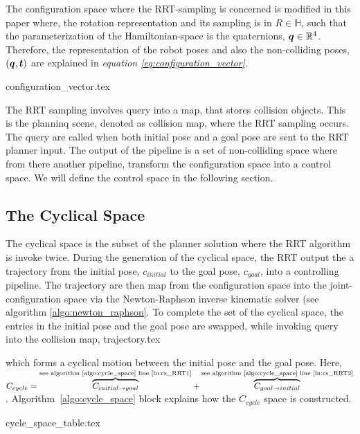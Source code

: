 \documentclass[a4paper, 10pt]{article}
\newcommand\thisPaperDir{/home/asl/version-control/ws_thesis/writing_papers/resampling_planning_in_dynamic_environment}
\numberwithin{equation}{section} %
\begin{document}
The configuration space where 
the RRT-sampling is concerned is modified in this paper where, 
the rotation representation and its sampling is in
$R \in \mathbb{H}$, such that the parameterization of
the Hamiltonian-space is the quaternions,
$\vb*{q} \in \mathbb{R}^4$. Therefore, the representation of the robot poses
and also the non-colliding poses, $(\vb*{q},\vb*{t})$ 
are explained in \textit{equation \ref{eq:configuration_vector}}.

{configuration_vector.tex}

The RRT sampling involves query into a map, that stores collision objects.
This is the planninq scene, denoted as collision map, where the RRT sampling occurs.
The query are
called when both initial pose and a goal pose are sent to the RRT planner input. 
The output of the pipeline is a set of non-colliding space where from there another
pipeline, transform the configuration space into a control space. We will define
the control space in the following section.
\subsection{The Cyclical Space}
The cyclical space is the subset of the planner solution where the RRT algorithm is invoke
twice. 
During the generation of the cyclical space,  the RRT
output the a trajectory from the
initial pose, $c_{initial}$ to the goal pose, $c_{goal}$, 
into a controlling pipeline. The trajectory
are then map from the configuration space into the joint-configuration space via
the Newton-Raphson inverse kinematic solver (see algorithm \ref{algo:newton_raphson}. To complete 
the set of the cyclical space, the entries in the initial pose and the goal pose
are swapped, while invoking query into the collision map,
{trajectory.tex}

which forms a cyclical motion between the initial pose and the goal
pose. Here, 
$C_{cycle} = \overbrace{ C_{initial \rightarrow goal}}^\text{see algorithm \ref{algo:cycle_space} line \ref{ln:cs_RRT1}} 
              + \overbrace{C_{goal \rightarrow initial}}^\text{see algorithm \ref{algo:cycle_space} line \ref{ln:cs_RRT2}}$.
Algorithm~\ref{algo:cycle_space} block explains how the $C_{cycle}$ space is constructed.

{cycle_space_table.tex}
\end{document}
